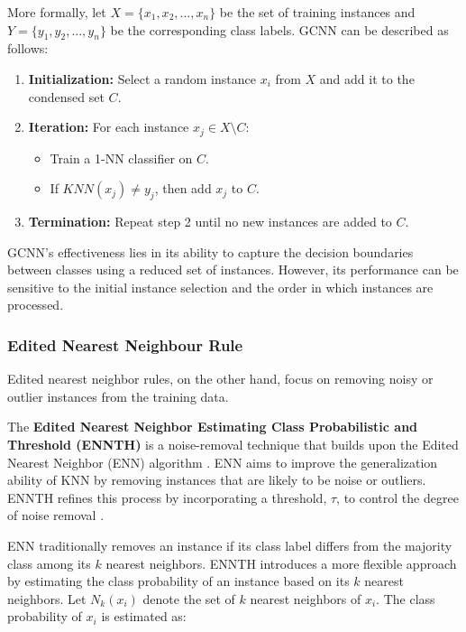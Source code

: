 More formally, let $X = \{x_1, x_2, ..., x_n\}$ be the set of training instances and $Y = \{y_1, y_2, ..., y_n\}$ be 
the corresponding class labels. GCNN can be described as follows:

\begin{enumerate}
    \item \textbf{Initialization:} Select a random instance $x_i$ from $X$ and add it to the condensed set $C$.
    \item \textbf{Iteration:} For each instance $x_j \in X \setminus C$:
    \begin{itemize}
        \item Train a 1-NN classifier on $C$.
        \item If $KNN(x_j) \neq y_j$, then add $x_j$ to $C$.
    \end{itemize}
    \item \textbf{Termination:} Repeat step 2 until no new instances are added to $C$.
\end{enumerate}

GCNN's effectiveness lies in its ability to capture the decision boundaries between classes using a reduced 
set of instances. However, its performance can be sensitive to the initial instance selection and the order 
in which instances are processed.



\subsubsection*{Edited Nearest Neighbour Rule}
Edited nearest neighbor rules, on the other hand, focus on removing noisy or outlier 
instances from the training data. 

The \textbf{Edited Nearest Neighbor Estimating Class Probabilistic and Threshold (ENNTH)} is a noise-removal
technique that builds upon the Edited Nearest Neighbor (ENN) algorithm \cite{Wilson2000,ENNTH}.
ENN aims to improve the generalization ability of KNN by removing instances that are likely to be noise or outliers.
ENNTH refines this process by incorporating a threshold, $\tau$, to control the degree of noise removal \cite{ENNTH}.

ENN traditionally removes an instance if its class label differs from the majority class among its $k$ nearest neighbors. ENNTH introduces a more flexible approach by estimating the class probability of an instance based on its $k$ nearest neighbors. Let $N_k(x_i)$ denote the set of $k$ nearest neighbors of $x_i$. The class probability of $x_i$ is estimated as:

